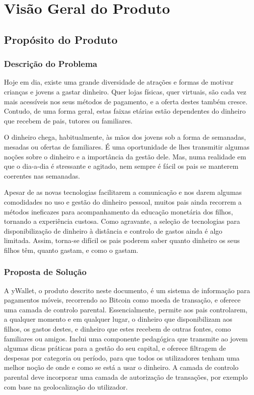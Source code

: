 \documentclass{article}
\begin{document}


\tableofcontents
\newpage
\section{Visão Geral do Produto}
  \subsection{Propósito do Produto}
    \subsubsection{Descrição do Problema}

      Hoje em dia, existe uma grande diversidade de atrações e formas de motivar crianças e jovens a gastar dinheiro. Quer lojas físicas, quer virtuais, são cada vez mais acessíveis nos seus métodos de pagamento, e a oferta destes também cresce. Contudo, de uma forma geral, estas faixas etárias estão dependentes do dinheiro que recebem de pais, tutores ou familiares.

      O dinheiro chega, habitualmente, às mãos dos jovens sob a forma de semanadas, mesadas ou ofertas de familiares. É uma oportunidade de lhes transmitir algumas noções sobre o dinheiro e a importância da gestão dele. Mas, numa realidade em que o dia-a-dia é stressante e agitado, nem sempre é fácil os pais se manterem coerentes nas semanadas.

      Apesar de as novas tecnologias facilitarem a comunicação e nos darem algumas comodidades no uso e gestão do dinheiro pessoal, muitos pais ainda recorrem a métodos ineficazes para acompanhamento da educação monetária dos filhos, tornando a experiência custosa. Como agravante, a seleção de tecnologias para disponibilização de dinheiro à distância e controlo de gastos ainda é algo limitada. Assim, torna-se difícil os pais poderem saber quanto dinheiro os seus filhos têm, quanto gastam, e como o gastam.

    \subsubsection{Proposta de Solução}

      A yWallet, o produto descrito neste documento, é um sistema de informação para pagamentos móveis, recorrendo ao Bitcoin como moeda de transação, e oferece uma camada de controlo parental. Essencialmente, permite aos pais controlarem, a qualquer momento e em qualquer lugar, o dinheiro que disponibilizam aos filhos, os gastos destes, e dinheiro que estes recebem de outras fontes, como familiares ou amigos. Inclui uma componente pedagógica que transmite ao jovem algumas dicas práticas para a gestão do seu capital, e oferece filtragem de despesas por categoria ou período, para que todos os utilizadores tenham uma melhor noção de onde e como se está a usar o dinheiro. A camada de controlo parental deve incorporar uma camada de autorização de transações, por exemplo com base na geolocalização do utilizador.
\end{document}
